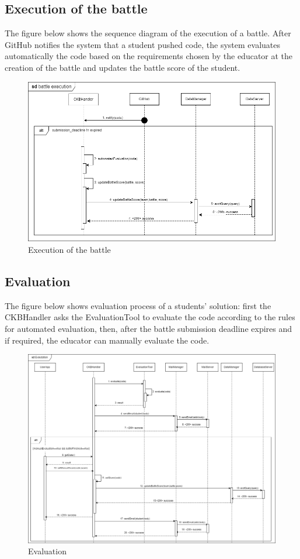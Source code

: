 \subsection{Execution of the battle}
The figure below shows the sequence diagram of the execution of a battle. After GitHub notifies the system that a student pushed code, the system
evaluates automatically the code based on the requirements chosen by the educator at the creation of the battle and
updates the battle score of the student.
\begin{figure}[H]
    \centering
    \includegraphics[width=1\textwidth]{images/seq_diagrams/battle_execution_DD.png}
    \caption{Execution of the battle}
\end{figure}
\clearpage

\subsection{Evaluation}
The figure below shows evaluation process of a students' solution: first the CKBHandler asks the EvaluationTool to evaluate the 
code according to the rules for automated evaluation, then, after the battle submission deadline expires and if required, the 
educator can manually evaluate the code.\\
\begin{figure}[H]
    \centering
    \includegraphics[width=1\textwidth]{images/seq_diagrams/evaluation_DD.png}
    \caption{Evaluation}
\end{figure}
\clearpage

